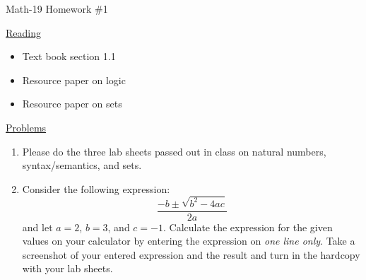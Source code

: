 \documentclass[letterpaper,12pt,fleqn]{article}
\begin{document}
\begin{center}
\Large Math-19 Homework \#1
\end{center}

\vspace{0.5in}

\underline{Reading}

\bigskip

\begin{itemize}
\item Text book section 1.1
\item Resource paper on logic
\item Resource paper on sets
\end{itemize}

\bigskip

\underline{Problems}

\bigskip

\begin{enumerate}
\item Please do the three lab sheets passed out in class on natural numbers,
  syntax/semantics, and sets.

\item Consider the following expression:
  \[\frac{-b\pm\sqrt{b^2-4ac}}{2a}\]
  and let $a=2$, $b=3$, and $c=-1$. Calculate the expression for the given
  values on your calculator by entering the expression on \emph{one line only}.
  Take a screenshot of your entered expression and the result and turn in the
  hardcopy with your lab sheets.
\end{enumerate}
\end{document}
